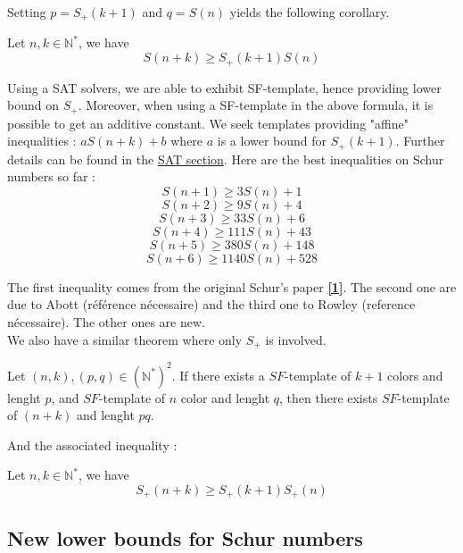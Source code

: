 Setting $p = S_+(k+1)$ and $q = S(n)$ yields the following corollary. 

\begin{corollary}
	Let \(n, k \in \mathbb{N}^*\), we have \\
	\[ S(n+k) \geqslant S_+(k+1)S(n) \]
\end{corollary}

Using a SAT solvers, we are able to exhibit SF-template,
hence providing lower bound on \(S_+\). Moreover, when using 
a SF-template in the above formula, it is possible to get an additive constant. We seek templates providing "affine"
inequalities : \(aS(n+k) + b \) where \(a\) is a lower bound for \(S_+(k+1)\). Further details can be found in the \hyperref[SAT]{SAT section}.
Here are the best inequalities on Schur numbers so far :
\[ S(n+1) \geqslant 3S(n) + 1 \]
\[ S(n+2) \geqslant 9S(n) + 4 \]
\[ S(n+3) \geqslant 33S(n) + 6 \]
\[ S(n+4) \geqslant 111S(n) + 43 \]
\[ S(n+5) \geqslant 380S(n) + 148 \]
\[ S(n+6) \geqslant 1140S(n) + 528 \]

The first inequality comes from the original Schur's paper \hyperlink{label1}{\textbf{[1]}}. The second one are due to Abott (référence nécessaire) 
and the third one to Rowley (reference nécessaire). The other ones are new. \\

We also have a similar theorem where only \(S_+\) is involved. 

\begin{theorem}
	Let $(n,k), (p,q) \in (\mathbb{N}^*)^2$. If there exists a \(SF\)-template of $k+1$ colors and lenght \(p\),
	and \(SF\)-template of \(n\) color and lenght \(q\), then there exists \(SF\)-template of \((n+k)\) and lenght \(pq\).
\end{theorem}

And the associated inequality :

\begin{corollary}
	Let \(n, k \in \mathbb{N}^*\), we have \\
	\[ S_+(n+k) \geqslant S_+(k+1)S_+(n) \]
\end{corollary}


\subsection{New lower bounds for Schur numbers}

